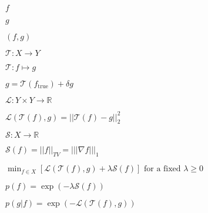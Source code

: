 \documentclass[multi={mymath},border=1pt,convert={convertexe={convert},density=300,size=800x800,outext=.png}]{standalone}
\newenvironment{mymath}{$\displaystyle}{$}
\def\R{{\mathbb R}}
\def\L2{{L^2(\mathbb{R})}}
\def\L{ {\mathcal{L}} }
\def\T{ {\mathcal{T}} }
\def\S{ {\mathcal{S}} }
\def\|{{|\!|}}
\begin{document}
\begin{mymath}
  f
\end{mymath}

\begin{mymath}
  g
\end{mymath}

\begin{mymath}
  (f, g)
\end{mymath}

\begin{mymath} 
  \T : X \rightarrow Y
\end{mymath}

\begin{mymath} 
  \T : f \mapsto g
\end{mymath}

\begin{mymath} 
  g = \T(f_{\textrm{true}}) + \delta g
\end{mymath}

\begin{mymath}
\L : Y \times Y \rightarrow \R
\end{mymath}

\begin{mymath}
\L(\T(f), g) = \| \T(f) - g \|^2_2
\end{mymath}

\begin{mymath}
  \S : X \rightarrow \R
\end{mymath}

\begin{mymath}
  \S(f) = \| f \|_{TV} = \| |\nabla f| \|_1
\end{mymath}

\begin{mymath}
  \min_{f \in X} \left[ \L(\T(f), g) + \lambda \S(f) \right] \textrm{ for a fixed } \lambda \ge 0
\end{mymath}

\begin{mymath}
p(f) = \exp\left( -\lambda \S(f) \right)
\end{mymath}

\begin{mymath}
p(g | f) = \exp\left( -\L(\T(f), g) \right)
\end{mymath}
\end{document}
